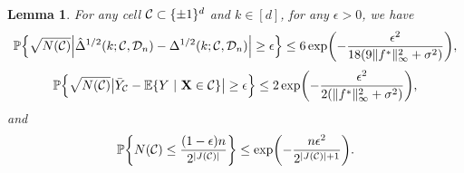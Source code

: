 \documentclass[11pt]{article}
\newtheorem{lemma}[theorem]{Lemma}
\newcommand{\bX}{\mathbf{X}}
\DeclarePairedDelimiter{\braces}{\lbrace}{\rbrace}
\DeclarePairedDelimiter{\paren}{(}{)}
\DeclarePairedDelimiter{\abs}{|}{|}
\DeclarePairedDelimiter{\norm}{\|}{\|}
\renewcommand{\P}{\mathbb{P}}
\newcommand{\E}{\mathbb{E}}
\newcommand{\cell}{\mathcal{C}}
\newcommand{\binspace}{\braces{\pm 1}^\nfeats}
\newcommand{\nfeats}{d}
\newcommand{\coordindices}{[\nfeats]}
\newcommand{\data}[1][n]{\mathcal{D}_{#1}}
\newcommand{\cellfeatindices}{J}
\newcommand{\rid}{\Delta^{1/2}}
\newcommand{\ridhat}{\hat\Delta^{1/2}}
\begin{document}
\begin{lemma}
    \label{lem:conc_cell_quantities}
    For any cell $\cell \subset \binspace$ and $k \in \coordindices$, for any $\epsilon > 0$, we have
    \begin{equation} \label{eq:rid_conc}
        \P\braces*{\sqrt{N(\cell)}\abs*{\ridhat(k;\cell,\data) - \rid(k;\cell,\data)} \geq \epsilon} \leq 6\exp\paren*{-\frac{\epsilon^2}{18(9\norm{f^*}_\infty^2 + \sigma^2)}},
    \end{equation}
    \begin{equation} \label{eq:cell_avg_conc}
        \P\braces*{\sqrt{N(\cell)}\abs*{\bar Y_{\cell} - \E\braces*{Y~|~\bX \in \cell}} \geq \epsilon} \leq 2\exp\paren*{-\frac{\epsilon^2}{2(\norm{f^*}_\infty^2 + \sigma^2)}},
    \end{equation}
    and
    \begin{equation} \label{eq:cell_count_conc}
        \P\braces*{N(\cell) \leq  \frac{(1-\epsilon)n}{2^{|\cellfeatindices(\cell)|}}} \leq \exp\paren*{-\frac{n\epsilon^2}{2^{|\cellfeatindices(\cell)|+1}}}.
    \end{equation}
\end{lemma}
\end{document}
